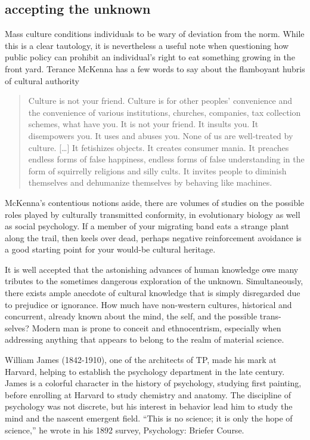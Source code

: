 \documentclass{UIdahoMastersThesis}
\begin{document}
\subsection{accepting the unknown}

Mass culture conditions individuals to be wary of deviation from the norm. While this is a clear tautology, it is nevertheless a useful note when questioning how public policy can prohibit an individual's right to eat something growing in the front yard. Terance McKenna has a few words to say about the flamboyant hubris of cultural authority

\begin{quote}
{Culture is not your friend. Culture is for other peoples' convenience and the convenience of various institutions, churches, companies, tax collection schemes, what have you. It is not your friend. It insults you. It disempowers you. It uses and abuses you. None of us are well-treated by culture. [\ldots] It fetishizes objects. It creates consumer mania. It preaches endless forms of false happiness, endless forms of false understanding in the form of squirrelly religions and silly cults. It invites people to diminish themselves and dehumanize themselves by behaving like machines.}
\end{quote}

McKenna's contentious notions aside, there are volumes of studies on the possible roles played by culturally transmitted conformity, in evolutionary biology as well as social psychology. If a member of your migrating band eats a strange plant along the trail, then keels over dead, perhaps negative reinforcement avoidance is a good starting point for your would-be cultural heritage.

It is well accepted that the astonishing advances of human knowledge owe many tributes to the sometimes dangerous exploration of the unknown. Simultaneously, there exists ample anecdote of cultural knowledge that is simply disregarded due to prejudice or ignorance. How much have non-western cultures, historical and concurrent, already known about the mind, the self, and the possible trans-selves? Modern man is prone to conceit and ethnocentrism, especially when addressing anything that appears to belong to the realm of material science.

William James (1842-1910), one of the architects of TP, made his mark at Harvard, helping to establish the psychology department in the late  century. James is a colorful character in the history of psychology, studying first painting, before enrolling at Harvard to study chemistry and anatomy. The discipline of psychology was not discrete, but his interest in behavior lead him to study the mind and the nascent emergent field. \enquote{This is no science; it is only the hope of science,} he wrote in his 1892 survey, Psychology: Briefer Course. 
\end{document}
